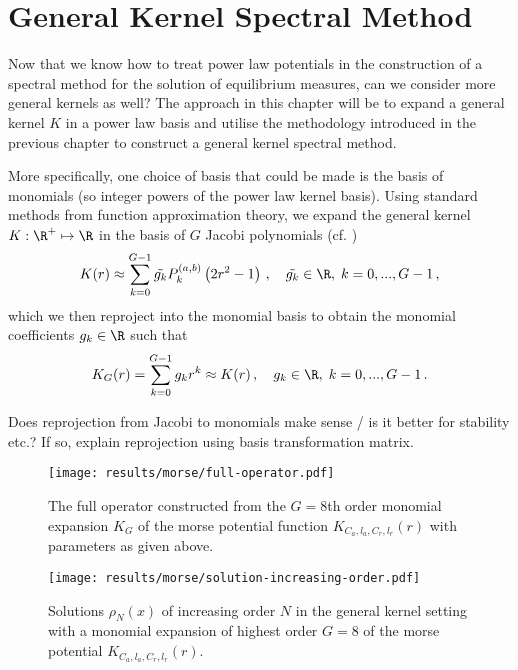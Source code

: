 \chapter{General Kernel Spectral Method}
\label{chap:general-kernel-spectral-method}

Now that we know how to treat power law potentials in the construction of a spectral method for the solution of equilibrium measures, can we consider more general kernels as well?
The approach in this chapter will be to expand a general kernel $K$ in a power law basis and utilise the methodology introduced in the previous chapter to construct a general kernel spectral method.

More specifically, one choice of basis that could be made is the basis of monomials (so integer powers of the power law kernel basis).
Using standard methods from function approximation theory, we expand the general kernel $K: \R^+ \mapsto \R$ in the basis of $G$ Jacobi polynomials (cf. )
$$K(r) \approx \sum_{k=0}^{G-1} \tilde{g_k} P_k^{(a, b)}\left(2 r^2 - 1\right)\,, \quad \tilde{g_k} \in \R, \;k = 0, ..., G-1\,,$$
which we then reproject into the monomial basis to obtain the monomial coefficients $g_k \in \R$ such that
\begin{equation}
  K_G(r) = \sum_{k=0}^{G-1} g_k r^k \approx K(r)\,,\quad g_k \in \R, \;k=0, ..., G-1\,.
  \label{eq:monomial-expansion}
\end{equation}

Does reprojection from Jacobi to monomials make sense / is it better for stability etc.?
If so, explain reprojection using basis transformation matrix.

\begin{figure}[H]
  \centering
  \texttt{[image: results/morse/full-operator.pdf]}
  \caption[Full Morse operator]{The full operator constructed from the $G=8$th order monomial expansion $K_G$ of the morse potential function $K_{C_a, l_a, C_r, l_r}(r)$ with parameters as given above.}
  \label{fig:morse-operator}
\end{figure}

\begin{figure}[H]
  \centering
  \texttt{[image: results/morse/solution-increasing-order.pdf]}
  \caption[General kernel solutions of increasing order]{Solutions $\rho_N(x)$ of increasing order $N$ in the general kernel setting with a monomial expansion of highest order $G = 8$ of the morse potential $K_{C_a, l_a, C_r, l_r}(r)$.}
  \label{fig:morse-solution-increasing-order}
\end{figure}

